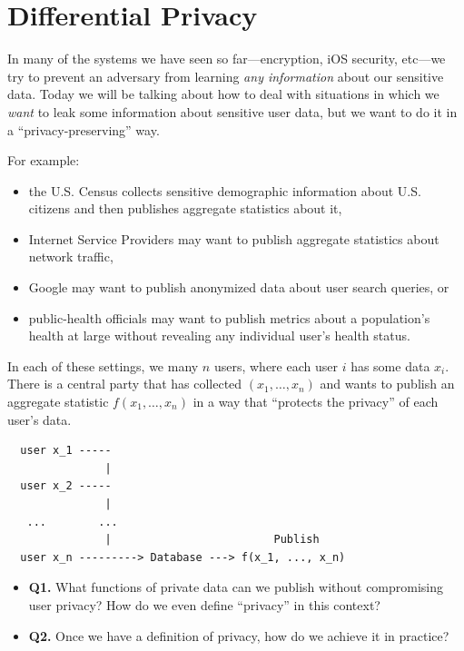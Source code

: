 \documentclass[
  letterpaper,
]{scrbook}
\providecommand{\tightlist}{%
  \setlength{\itemsep}{0pt}\setlength{\parskip}{0pt}}
\theoremstyle{definition}
\theoremstyle{plain}
\theoremstyle{plain}
\theoremstyle{remark}
\begin{document}
\chapter{Differential Privacy}\label{differential-privacy}

In many of the systems we have seen so far---encryption, iOS security,
etc---we try to prevent an adversary from learning \emph{any
information} about our sensitive data. Today we will be talking about
how to deal with situations in which we \emph{want} to leak some
information about sensitive user data, but we want to do it in a
``privacy-preserving'' way.

For example:

\begin{itemize}
\tightlist
\item
  the U.S. Census collects sensitive demographic information about U.S.
  citizens and then publishes aggregate statistics about it,
\item
  Internet Service Providers may want to publish aggregate statistics
  about network traffic,
\item
  Google may want to publish anonymized data about user search queries,
  or
\item
  public-health officials may want to publish metrics about a
  population's health at large without revealing any individual user's
  health status.
\end{itemize}

In each of these settings, we many \(n\) users, where each user \(i\)
has some data \(x_i\). There is a central party that has collected
\((x_1, \dots, x_n)\) and wants to publish an aggregate statistic
\(f(x_1, \dots, x_n)\) in a way that ``protects the privacy'' of each
user's data.


\begin{verbatim}
  user x_1 -----
               |
  user x_2 -----
               |
   ...        ...
               |                         Publish
  user x_n ---------> Database ---> f(x_1, ..., x_n)
\end{verbatim}

\begin{itemize}
\tightlist
\item
  \textbf{Q1.} What functions of private data can we publish without
  compromising user privacy? How do we even define ``privacy'' in this
  context?
\item
  \textbf{Q2.} Once we have a definition of privacy, how do we achieve
  it in practice?
\end{itemize}
\end{document}

